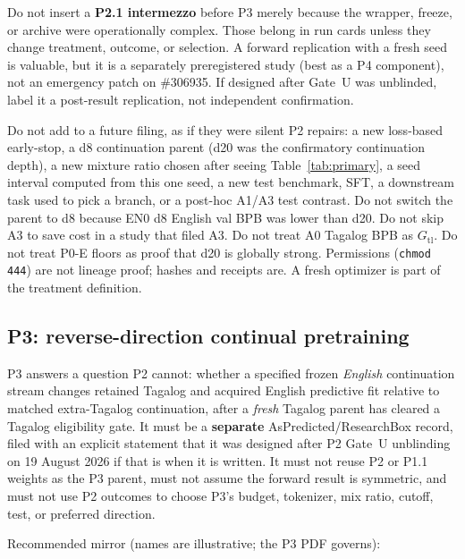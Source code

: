 \documentclass[11pt,a4paper]{article}
\begin{document}
Do not insert a \textbf{P2.1 intermezzo} before P3 merely because the wrapper, freeze, or archive were operationally complex. Those belong in run cards unless they change treatment, outcome, or selection. A forward replication with a fresh seed is valuable, but it is a separately preregistered study (best as a P4 component), not an emergency patch on \#306935. If designed after Gate~U was unblinded, label it a post-result replication, not independent confirmation.

Do not add to a future filing, as if they were silent P2 repairs: a new loss-based early-stop, a d8 continuation parent (d20 was the confirmatory continuation depth), a new mixture ratio chosen after seeing Table~\ref{tab:primary}, a seed interval computed from this one seed, a new test benchmark, SFT, a downstream task used to pick a branch, or a post-hoc A1/A3 test contrast. Do not switch the parent to d8 because EN0 d8 English val BPB was lower than d20. Do not skip A3 to save cost in a study that filed A3. Do not treat A0 Tagalog BPB as \(G_{\mathrm{tl}}\). Do not treat P0-E floors as proof that d20 is globally strong. Permissions (\texttt{chmod 444}) are not lineage proof; hashes and receipts are. A fresh optimizer is part of the treatment definition.

\subsection{P3: reverse-direction continual pretraining}
P3 answers a question P2 cannot: whether a specified frozen \emph{English} continuation stream changes retained Tagalog and acquired English predictive fit relative to matched extra-Tagalog continuation, after a \emph{fresh} Tagalog parent has cleared a Tagalog eligibility gate. It must be a \textbf{separate} AsPredicted/ResearchBox record, filed with an explicit statement that it was designed after P2 Gate~U unblinding on 19 August 2026 if that is when it is written. It must not reuse P2 or P1.1 weights as the P3 parent, must not assume the forward result is symmetric, and must not use P2 outcomes to choose P3's budget, tokenizer, mix ratio, cutoff, test, or preferred direction.

Recommended mirror (names are illustrative; the P3 PDF governs):
\end{document}
